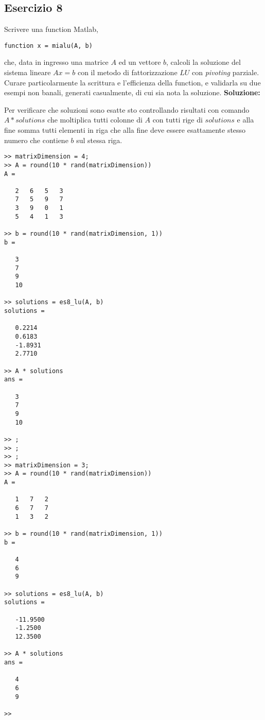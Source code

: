 \subsection{Esercizio 8}
Scrivere una function Matlab,
\begin{lstlisting}
function x = mialu(A, b)
\end{lstlisting}
che, data in ingresso una matrice $A$ ed un vettore $b$, calcoli la soluzione
del sistema lineare $Ax = b$ con il metodo di fattorizzazione $LU$ con \textit{pivoting} parziale.
Curare particolarmente la scrittura e l'efficienza della function,
e validarla su due esempi non banali, generati casualmente,
di cui sia nota la soluzione.
\newline \textbf{Soluzione:} \newline

Per verificare che soluzioni sono esatte sto controllando risultati con comando $A * solutions$
che moltiplica tutti colonne di $A$ con tutti rige di $solutions$ e alla fine somma tutti
elementi in riga che alla fine deve essere esattamente stesso numero
che contiene $b$ sul stessa riga.
\begin{lstlisting}
>> matrixDimension = 4;
>> A = round(10 * rand(matrixDimension))
A =

   2   6   5   3
   7   5   9   7
   3   9   0   1
   5   4   1   3

>> b = round(10 * rand(matrixDimension, 1))
b =

   3
   7
   9
   10

>> solutions = es8_lu(A, b)
solutions =

   0.2214
   0.6183
   -1.8931
   2.7710

>> A * solutions
ans =

   3
   7
   9
   10

>> ;
>> ;
>> ;
>> matrixDimension = 3;
>> A = round(10 * rand(matrixDimension))
A =

   1   7   2
   6   7   7
   1   3   2

>> b = round(10 * rand(matrixDimension, 1))
b =

   4
   6
   9

>> solutions = es8_lu(A, b)
solutions =

   -11.9500
   -1.2500
   12.3500

>> A * solutions
ans =

   4
   6
   9

>>
\end{lstlisting}
